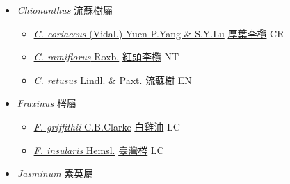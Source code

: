 
  \begin{itemize}
 \item[] \textit{Chionanthus} 流蘇樹屬
                    
  \begin{itemize}
        \item[] \href{http://www.theplantlist.org/tpl1.1/search?q=Chionanthus+coriaceus}{\textit{C. coriaceus} (Vidal.) Yuen P.Yang \& S.Y.Lu}   \href{\detokenize{http://taibnet.sinica.edu.tw/chi/taibnet_species_list.php?T2=厚葉李欖&T2_new_value=true&fr=y}}{厚葉李欖} CR
        \item[] \href{http://www.theplantlist.org/tpl1.1/search?q=Chionanthus+ramiflorus}{\textit{C. ramiflorus} Roxb.}   \href{\detokenize{http://taibnet.sinica.edu.tw/chi/taibnet_species_list.php?T2=紅頭李欖&T2_new_value=true&fr=y}}{紅頭李欖} NT
        \item[] \href{http://www.theplantlist.org/tpl1.1/search?q=Chionanthus+retusus}{\textit{C. retusus} Lindl. \& Paxt.}   \href{\detokenize{http://taibnet.sinica.edu.tw/chi/taibnet_species_list.php?T2=流蘇樹&T2_new_value=true&fr=y}}{流蘇樹} EN
  \end{itemize}
 \item[] \textit{Fraxinus} 梣屬
                    
  \begin{itemize}
        \item[] \href{http://www.theplantlist.org/tpl1.1/search?q=Fraxinus+griffithii}{\textit{F. griffithii} C.B.Clarke}   \href{\detokenize{http://taibnet.sinica.edu.tw/chi/taibnet_species_list.php?T2=白雞油&T2_new_value=true&fr=y}}{白雞油} LC
        \item[] \href{http://www.theplantlist.org/tpl1.1/search?q=Fraxinus+insularis}{\textit{F. insularis} Hemsl.}   \href{\detokenize{http://taibnet.sinica.edu.tw/chi/taibnet_species_list.php?T2=臺灣梣&T2_new_value=true&fr=y}}{臺灣梣} LC
  \end{itemize}
 \item[] \textit{Jasminum} 素英屬
                    

\end{itemize}
